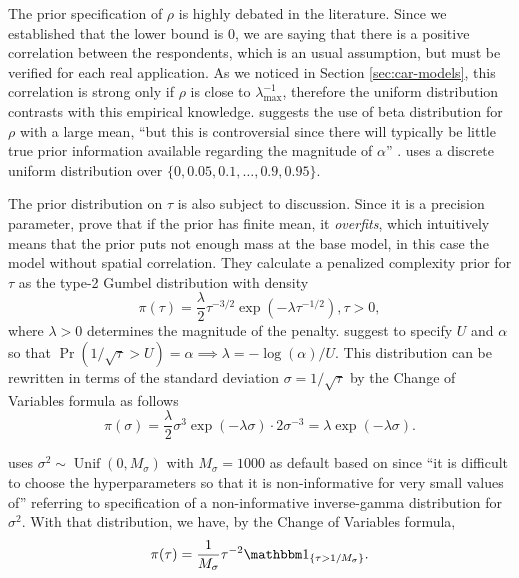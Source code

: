 The prior specification of $\rho$ is highly debated in the literature.
Since we established that the lower bound is 0, we are saying that there is a
positive correlation between the respondents, which is an usual assumption,
but must be verified for each real application. As we noticed in Section
\ref{sec:car-models}, this correlation is strong only if $\rho$ is close to
$\lambda_{\max}^{-1}$, therefore the uniform distribution contrasts with
this empirical knowledge. \textcite[p. 177]{banerjee2003hierarchical} suggests
the use of beta distribution for $\rho$ with a large mean, ``but this is
controversial since there will typically be little true prior information
available regarding the magnitude of $\alpha$'' \cite[$\alpha$ is the
  parameter $\rho$ in our notation.][p.
  177]{banerjee2003hierarchical}. \textcite[p. 81]{lee2011comparison} uses a
discrete uniform distribution over $\{0, 0.05, 0.1, \dots, 0.9, 0.95\}$.

The prior distribution on $\tau$ is also subject to discussion. Since it is a
precision parameter, \textcite[p. 9, Theorem 1]{simpson2017penalising} prove
that if the prior has finite mean, it {\em overfits}, which intuitively means
that the prior puts not enough mass at the base model, in this case the model
without spatial correlation. They calculate a penalized complexity prior for
$\tau$ as the type-2 Gumbel distribution with density
\begin{equation}
  \label{eq:gumbel-distribution}
  \pi(\tau) = \frac{\lambda}{2}\tau^{-3/2}\exp(-\lambda \tau^{-1/2}), \tau > 0,
\end{equation}
where $\lambda > 0$ determines the magnitude of the penalty.
\textcite[p. 9]{simpson2017penalising} suggest to specify $U$ and
$\alpha$ so that $\Pr(1 / \sqrt{\tau} > U) = \alpha \implies \lambda =
  -\log(\alpha)/U$. This distribution can be rewritten in terms of the standard
deviation $\sigma = 1/ \sqrt{\tau}$ by the Change of Variables
formula as follows
\begin{equation}
  \label{eq:standard-deviation-gumbel}
  \pi(\sigma) = \frac{\lambda}{2}\sigma^{3}\exp(-\lambda \sigma) \cdot 2\sigma^{-3} = \lambda \exp(-\lambda \sigma).
\end{equation}

\textcite[p. 5]{lee2013carbayes} uses $\sigma^2 \sim \operatorname{Unif}(0,
  M_{\sigma})$ with $M_{\sigma} = 1000$ as default based on
\textcite{gelman2006prior} since ``it is difficult to choose the
hyperparameters so that it is non-informative for very small values of''
\cite[p. 4]{lee2013carbayes} referring to specification of a non-informative
inverse-gamma distribution for $\sigma^2$. With that distribution, we
have, by the Change of Variables formula,
$$
  \pi(\tau) = \frac{1}{M_{\sigma}}\tau^{-2}\ind_{\{\tau > 1/M_{\sigma}\}}.
$$

